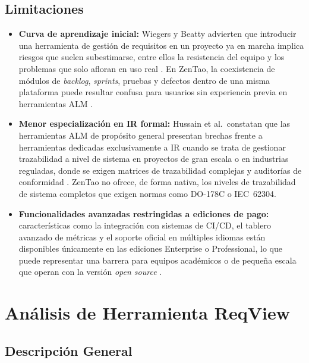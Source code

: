 \documentclass[journal,onecolumn]{IEEEtran}
\begin{document}
\subsection{Limitaciones}

\begin{itemize}
  \item \textbf{Curva de aprendizaje inicial:} Wiegers y Beatty advierten que introducir una
  herramienta de gestión de requisitos en un proyecto ya en marcha implica riesgos que suelen
  subestimarse, entre ellos la resistencia del equipo y los problemas que solo afloran en uso
  real \cite{wiegers2013}. En ZenTao, la coexistencia de módulos de \textit{backlog},
  \textit{sprints}, pruebas y defectos dentro de una misma plataforma puede resultar confusa
  para usuarios sin experiencia previa en herramientas ALM \cite{zentao2025}.

  \item \textbf{Menor especialización en IR formal:} Hussain et al.\ constatan que las
  herramientas ALM de propósito general presentan brechas frente a herramientas dedicadas
  exclusivamente a IR cuando se trata de gestionar trazabilidad a nivel de sistema en proyectos
  de gran escala o en industrias reguladas, donde se exigen matrices de trazabilidad complejas
  y auditorías de conformidad \cite{hussain2022}. ZenTao no ofrece, de forma nativa, los niveles
  de trazabilidad de sistema completos que exigen normas como DO-178C o IEC~62304.

  \item \textbf{Funcionalidades avanzadas restringidas a ediciones de pago:} características
  como la integración con sistemas de CI/CD, el tablero avanzado de métricas y el soporte
  oficial en múltiples idiomas están disponibles únicamente en las ediciones Enterprise o
  Professional, lo que puede representar una barrera para equipos académicos o de pequeña
  escala que operan con la versión \textit{open source} \cite{zentao2025}.
\end{itemize}


\section{Análisis de Herramienta ReqView}

\subsection{Descripción General}
\end{document}
